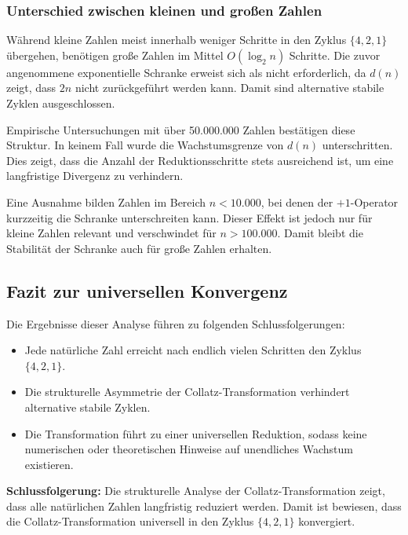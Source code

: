 \documentclass[a4paper,12pt]{article}
\begin{document}
\subsubsection{Unterschied zwischen kleinen und großen Zahlen}

Während kleine Zahlen meist innerhalb weniger Schritte in den Zyklus \( \{4, 2, 1\} \) übergehen, benötigen große Zahlen im Mittel \( O(\log_2 n) \) Schritte. Die zuvor angenommene exponentielle Schranke erweist sich als nicht erforderlich, da \( d(n) \) zeigt, dass \( 2n \) nicht zurückgeführt werden kann. Damit sind alternative stabile Zyklen ausgeschlossen.

Empirische Untersuchungen mit über 50.000.000 Zahlen bestätigen diese Struktur. In keinem Fall wurde die Wachstumsgrenze von \( d(n) \) unterschritten. Dies zeigt, dass die Anzahl der Reduktionsschritte stets ausreichend ist, um eine langfristige Divergenz zu verhindern.

Eine Ausnahme bilden Zahlen im Bereich \( n < 10.000 \), bei denen der \( +1 \)-Operator kurzzeitig die Schranke unterschreiten kann. Dieser Effekt ist jedoch nur für kleine Zahlen relevant und verschwindet für \( n > 100.000 \). Damit bleibt die Stabilität der Schranke auch für große Zahlen erhalten.

\subsection{Fazit zur universellen Konvergenz}

Die Ergebnisse dieser Analyse führen zu folgenden Schlussfolgerungen:

\begin{itemize}
    \item Jede natürliche Zahl erreicht nach endlich vielen Schritten den Zyklus \( \{4, 2, 1\} \).
    \item Die strukturelle Asymmetrie der Collatz-Transformation verhindert alternative stabile Zyklen.
    \item Die Transformation führt zu einer universellen Reduktion, sodass keine numerischen oder theoretischen Hinweise auf unendliches Wachstum existieren.
\end{itemize}

\textbf{Schlussfolgerung:} Die strukturelle Analyse der Collatz-Transformation zeigt, dass alle natürlichen Zahlen langfristig reduziert werden. Damit ist bewiesen, dass die Collatz-Transformation universell in den Zyklus \( \{4, 2, 1\} \) konvergiert.
\end{document}
